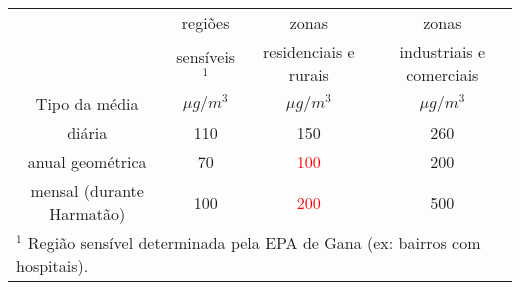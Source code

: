 \begin{tabular}{cccc}
\hline
                              &   regiões  &        zonas       &         zonas               \\
                              & sensíveis$^1$  & residenciais e rurais & industriais e comerciais      \\
Tipo da média                 & $\mu g/ m^3$ & $\mu g/ m^3$ & $\mu g/ m^3$      \\
\hline
diária                    & 110             & 150                      & 260         \\       
anual geométrica          & 70              &\textcolor{red}{100}                      & 200                   \\
mensal (durante Harmatão) & 100             & \textcolor{red}{200}                      & 500                     \\
\hline
\multicolumn{4}{l}{$^1$ Região sensível determinada pela EPA de Gana (ex: bairros com hospitais).} \\
\hline
\end{tabular}
